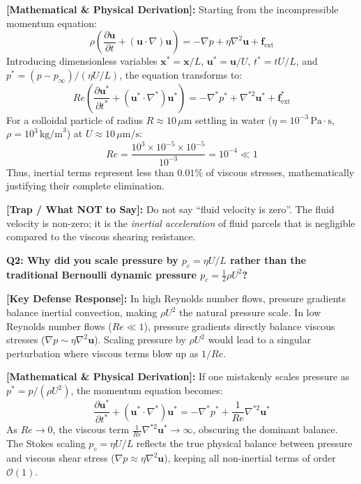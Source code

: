 \documentclass[11pt,a4paper]{article}
\newcommand{\question}[2]{
    \vspace{0.4cm}
    \noindent\colorbox{blue!10}{\parbox{\dimexpr\textwidth-2\fboxsep\relax}{
        \textbf{#1: #2}
    }}
    \vspace{0.2cm}
}
\newcommand{\shortanswer}[1]{
    \noindent\textbf{\textcolor{green!50!black}{[Key Defense Response]:}} #1
    \vspace{0.2cm}
}
\newcommand{\deepdetails}[1]{
    \noindent\textbf{\textcolor{blue!60!black}{[Mathematical \& Physical Derivation]:}} #1
    \vspace{0.2cm}
}
\newcommand{\pitfall}[1]{
    \noindent\textbf{\textcolor{red!70!black}{[Trap / What NOT to Say]:}} #1
    \vspace{0.3cm}
}
\begin{document}
\deepdetails{
Starting from the incompressible momentum equation:
\begin{equation}
    \rho \left( \frac{\partial \mathbf{u}}{\partial t} + (\mathbf{u} \cdot \nabla) \mathbf{u} \right) = -\nabla p + \eta \nabla^2 \mathbf{u} + \mathbf{f}_{\text{ext}}
\end{equation}
Introducing dimensionless variables $\mathbf{x}^* = \mathbf{x}/L$, $\mathbf{u}^* = \mathbf{u}/U$, $t^* = t U / L$, and $p^* = (p - p_\infty)/(\eta U / L)$, the equation transforms to:
\begin{equation}
    Re \left( \frac{\partial \mathbf{u}^*}{\partial t^*} + (\mathbf{u}^* \cdot \nabla^*) \mathbf{u}^* \right) = -\nabla^* p^* + \nabla^{*2} \mathbf{u}^* + \mathbf{f}^*_{\text{ext}}
\end{equation}
For a colloidal particle of radius $R \approx 10\,\mu\text{m}$ settling in water ($\eta = 10^{-3}\,\text{Pa}\cdot\text{s}$, $\rho = 10^3\,\text{kg/m}^3$) at $U \approx 10\,\mu\text{m/s}$:
\begin{equation}
    Re = \frac{10^3 \times 10^{-5} \times 10^{-5}}{10^{-3}} = 10^{-4} \ll 1
\end{equation}
Thus, inertial terms represent less than $0.01\%$ of viscous stresses, mathematically justifying their complete elimination.
}

\pitfall{Do not say ``fluid velocity is zero''. The fluid velocity is non-zero; it is the \emph{inertial acceleration} of fluid parcels that is negligible compared to the viscous shearing resistance.}

\vspace{0.4cm}
\question{Q2}{Why did you scale pressure by $p_c = \eta U / L$ rather than the traditional Bernoulli dynamic pressure $p_c = \frac{1}{2}\rho U^2$?}

\shortanswer{In high Reynolds number flows, pressure gradients balance inertial convection, making $\rho U^2$ the natural pressure scale. In low Reynolds number flows ($Re \ll 1$), pressure gradients directly balance viscous stresses ($\nabla p \sim \eta \nabla^2 \mathbf{u}$). Scaling pressure by $\rho U^2$ would lead to a singular perturbation where viscous terms blow up as $1/Re$.}

\deepdetails{
If one mistakenly scales pressure as $p^* = p / (\rho U^2)$, the momentum equation becomes:
\begin{equation}
    \frac{\partial \mathbf{u}^*}{\partial t^*} + (\mathbf{u}^* \cdot \nabla^*) \mathbf{u}^* = -\nabla^* p^* + \frac{1}{Re} \nabla^{*2} \mathbf{u}^*
\end{equation}
As $Re \to 0$, the viscous term $\frac{1}{Re} \nabla^{*2} \mathbf{u}^* \to \infty$, obscuring the dominant balance. The Stokes scaling $p_c = \eta U / L$ reflects the true physical balance between pressure and viscous shear stress ($\nabla p \approx \eta \nabla^2 \mathbf{u}$), keeping all non-inertial terms of order $\mathcal{O}(1)$.
}
\end{document}

